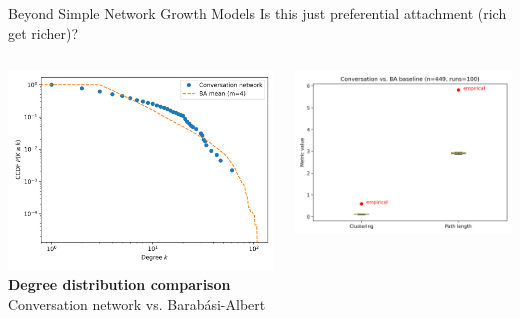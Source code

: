 \documentclass[nodes]{beamer}
\begin{document}
\begin{frame}{Beyond Simple Network Growth Models}
  Is this just \alert{preferential attachment} (rich get richer)?
  \begin{columns}[T]
    \begin{column}{0.45\textwidth}
      \includegraphics[width=\linewidth]{images/degree_overlay.png}
      \scriptsize \textbf{Degree distribution comparison}\\
      \scriptsize Conversation network vs. Barabási-Albert
    \end{column}
    \begin{column}{0.45\textwidth}
      \includegraphics[width=\linewidth]{images/metrics_boxplot.png}

\end{column}
\end{columns}
\end{frame}
\end{document}

